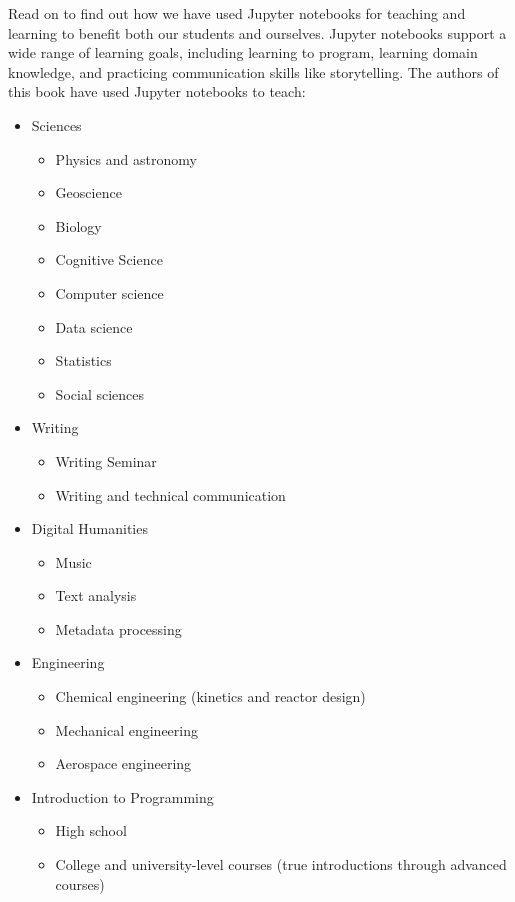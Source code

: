 \documentclass[]{book}
\providecommand{\tightlist}{%
  \setlength{\itemsep}{0pt}\setlength{\parskip}{0pt}}
\begin{document}
Read on to find out how we have used Jupyter notebooks for teaching and
learning to benefit both our students and ourselves. Jupyter notebooks
support a wide range of learning goals, including learning to program,
learning domain knowledge, and practicing communication skills like
storytelling. The authors of this book have used Jupyter notebooks to
teach:

\begin{itemize}
\tightlist
\item
  Sciences

  \begin{itemize}
  \tightlist
  \item
    Physics and astronomy
  \item
    Geoscience
  \item
    Biology
  \item
    Cognitive Science
  \item
    Computer science
  \item
    Data science
  \item
    Statistics
  \item
    Social sciences
  \end{itemize}
\item
  Writing

  \begin{itemize}
  \tightlist
  \item
    Writing Seminar
  \item
    Writing and technical communication
  \end{itemize}
\item
  Digital Humanities

  \begin{itemize}
  \tightlist
  \item
    Music
  \item
    Text analysis
  \item
    Metadata processing
  \end{itemize}
\item
  Engineering

  \begin{itemize}
  \tightlist
  \item
    Chemical engineering (kinetics and reactor design)
  \item
    Mechanical engineering
  \item
    Aerospace engineering
  \end{itemize}
\item
  Introduction to Programming

  \begin{itemize}
  \tightlist
  \item
    High school
  \item
    College and university-level courses (true introductions through
    advanced courses)
  \end{itemize}
\end{itemize}
\end{document}
